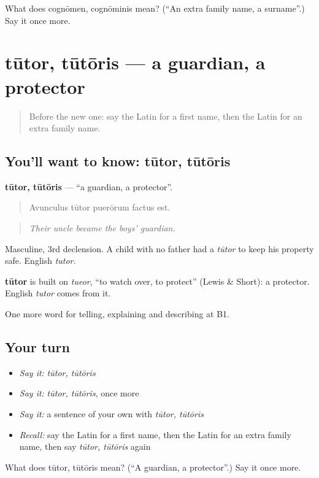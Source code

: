 \begin{tcolorbox}[breakable,colback=teal!4,colframe=teal!35!black,title={Before you move on}]
What does cognōmen, cognōminis mean? (\textquotedblleft{}An extra family name, a surname\textquotedblright{}.) Say it once more.
\end{tcolorbox}
\section[tūtor, tūtōris]{tūtor, tūtōris — a guardian, a protector}

\label{lesson:LA-C325-tutor}



\begin{quote}
Before the new one: say the Latin for a first name, then the Latin for an extra family name.
\end{quote}

\subsection*{You'll want to know: tūtor, tūtōris}
\textbf{tūtor, tūtōris} — \textquotedblleft{}a guardian, a protector\textquotedblright{}.

\begin{quote}
Avunculus tūtor puerōrum factus est.
\end{quote}

\begin{quote}
\emph{Their uncle became the boys' guardian.}
\end{quote}

Masculine, 3rd declension. A child with no father had a \emph{tūtor} to keep his property safe. English \emph{tutor}.

\begin{cousinweb}
\textbf{tūtor} is built on \emph{tueor}, \textquotedblleft{}to watch over, to protect\textquotedblright{} (Lewis \& Short): a protector. English \emph{tutor} comes from it.
\end{cousinweb}

\begin{grammarlens}[title={What you've built}]
One more word for telling, explaining and describing at B1.
\end{grammarlens}

\subsection*{Your turn}
\begin{itemize}
\raggedright
  \item \emph{Say it:} \emph{tūtor, tūtōris}
  \item \emph{Say it:} \emph{tūtor, tūtōris}, once more
  \item \emph{Say it:} a sentence of your own with \emph{tūtor, tūtōris}
  \item \emph{Recall:} say the Latin for a first name, then the Latin for an extra family name, then say \emph{tūtor, tūtōris} again
\end{itemize}

\begin{tcolorbox}[breakable,colback=teal!4,colframe=teal!35!black,title={Before you move on}]
What does tūtor, tūtōris mean? (\textquotedblleft{}A guardian, a protector\textquotedblright{}.) Say it once more.
\end{tcolorbox}
